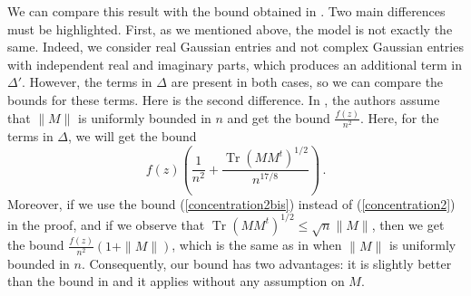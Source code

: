 \documentclass[11pt,a4paper]{article}
\DeclareMathOperator{\1}{\mathbf{1}}
\DeclareMathOperator{\Tr}{\mathrm{Tr}}
\theoremstyle{definition}
\begin{document}
We can compare this result with the bound obtained in \cite[Proposition 6]{VLM}. Two main differences must be highlighted. First, as we mentioned above, the model is not exactly the same. Indeed, we consider real Gaussian entries and not complex Gaussian entries with independent real and imaginary parts, which produces an additional term in $\Delta'$. However, the terms in $\Delta$ are present in both cases, so we can compare the bounds for these terms. Here is the second difference. In \cite{VLM}, the authors assume that $\|M\|$ is uniformly bounded in $n$ and get the bound $\frac{f(z)}{n^2}$. Here, for the terms in $\Delta$, we will get the bound
\begin{displaymath}
f(z) \left( \frac{1}{n^2} + \frac{\Tr(MM^t)^{1/2}}{n^{17/8}} \right) \, .
\end{displaymath}
Moreover, if we use the bound (\ref{concentration2bis}) instead of (\ref{concentration2}) in the proof, and if we observe that $\Tr(MM^t)^{1/2} \le \sqrt{n} \|M\|$, then we get the bound $\frac{f(z)}{n^2} (1+\|M\|)$, which is the same as in \cite{VLM} when $\|M\|$ is uniformly bounded in $n$. Consequently, our bound has two advantages: it is slightly better than the bound in \cite{VLM} and it applies without any assumption on $M$.
\end{document}
